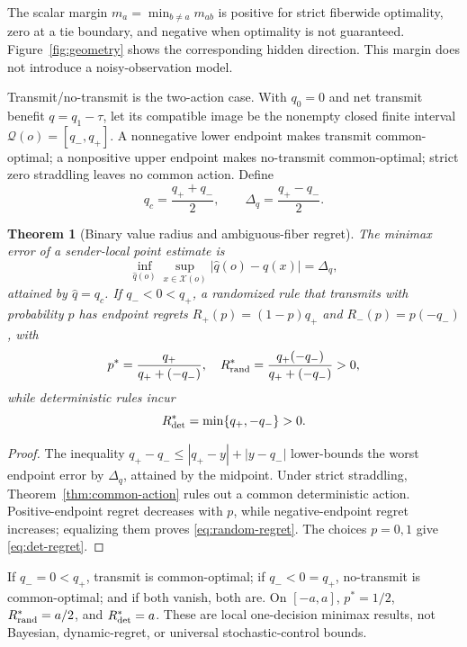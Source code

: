 \documentclass[10pt,twocolumn,twoside]{IEEEtran}
\newtheorem{theorem}{Theorem}
\begin{document}
The scalar margin \(m_a=\min_{b\ne a}m_{ab}\) is positive for strict
fiberwide optimality, zero at a tie boundary, and negative when optimality is
not guaranteed.  Figure~\ref{fig:geometry} shows the corresponding hidden
direction.  This margin does not introduce a noisy-observation model.

Transmit/no-transmit is the two-action case.  With \(q_0=0\) and net transmit
benefit \(q=q_1-\tau\), let its compatible image be the nonempty closed finite
interval \(\mathcal Q(o)=[q_-,q_+]\).  A nonnegative lower endpoint makes
transmit common-optimal; a nonpositive upper endpoint makes no-transmit
common-optimal; strict zero straddling leaves no common action.  Define
\begin{equation}
q_c=\frac{q_++q_-}{2},\qquad
\Delta_q=\frac{q_+-q_-}{2}.
\label{eq:value-radius}
\end{equation}

\begin{theorem}[Binary value radius and ambiguous-fiber regret]
\label{thm:sign}
The minimax error of a sender-local point estimate is
\begin{equation}
\inf_{\widehat q(o)}\sup_{x\in\mathcal X(o)}
|\widehat q(o)-q(x)|=\Delta_q,
\label{eq:minimax-value}
\end{equation}
attained by \(\widehat q=q_c\).  If \(q_-<0<q_+\), a randomized rule that
transmits with probability \(p\) has endpoint regrets
\(R_+(p)=(1-p)q_+\) and \(R_-(p)=p(-q_-)\), with
\begin{equation}
p^*=\frac{q_+}{q_++(-q_-)},\quad
R_{\rm rand}^*=\frac{q_+(-q_-)}{q_++(-q_-)}>0,
\label{eq:random-regret}
\end{equation}
while deterministic rules incur
\begin{equation}
R_{\rm det}^*=\min\{q_+,-q_-\}>0.
\label{eq:det-regret}
\end{equation}
\end{theorem}

\begin{proof}
The inequality
\(q_+-q_-\le |q_+-y|+|y-q_-|\) lower-bounds the worst endpoint error by
\(\Delta_q\), attained by the midpoint.  Under strict straddling,
Theorem~\ref{thm:common-action} rules out a common deterministic action.
Positive-endpoint regret decreases with \(p\), while negative-endpoint regret
increases; equalizing them proves \eqref{eq:random-regret}.  The choices
\(p=0,1\) give \eqref{eq:det-regret}.
\end{proof}

If \(q_-=0<q_+\), transmit is common-optimal; if \(q_-<0=q_+\), no-transmit
is common-optimal; and if both vanish, both are.  On \([-a,a]\),
\(p^*=1/2\), \(R_{\rm rand}^*=a/2\), and \(R_{\rm det}^*=a\).  These are
local one-decision minimax results, not Bayesian, dynamic-regret, or universal
stochastic-control bounds.
\end{document}
